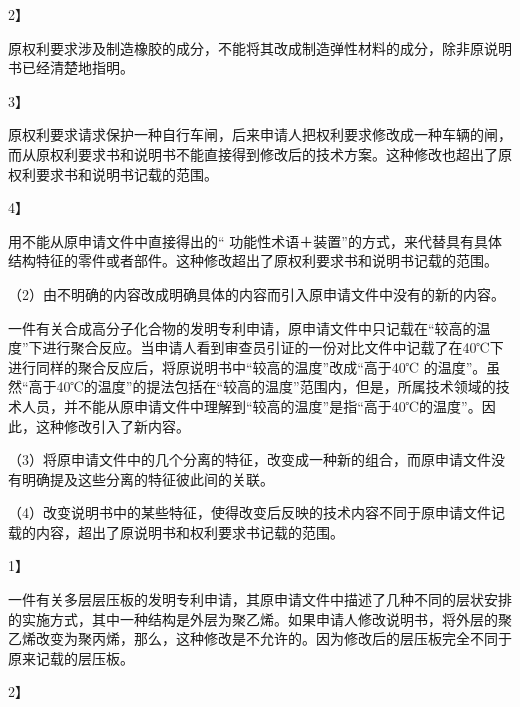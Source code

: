 {2{\kaiti 】}\par}

原权利要求涉及制造橡胶的成分，不能将其改成制造弹性材料的成分，除非原说明书已经清楚地指明。

{3{\kaiti 】}\par}

原权利要求请求保护一种自行车闸，后来申请人把权利要求修改成一种车辆的闸，而从原权利要求书和说明书不能直接得到修改后的技术方案。这种修改也超出了原权利要求书和说明书记载的范围。

{4{\kaiti 】}\par}

用不能从原申请文件中直接得出的“ 功能性术语＋装置”的方式，来代替具有具体结构特征的零件或者部件。这种修改超出了原权利要求书和说明书记载的范围。

{\setlength{\parindent}{17.1bp}（2）由不明确的内容改成明确具体的内容而引入原申请文件中没有的新的内容。\par}

{\par}

一件有关合成高分子化合物的发明专利申请，原申请文件中只记载在“较高的温度”下进行聚合反应。当申请人看到审查员引证的一份对比文件中记载了在40℃下进行同样的聚合反应后，将原说明书中“较高的温度”改成“高于40℃ 的温度”。虽然“高于40℃的温度”的提法包括在“较高的温度”范围内，但是，所属技术领域的技术人员，并不能从原申请文件中理解到“较高的温度”是指“高于40℃的温度”。因此，这种修改引入了新内容。

{\setlength{\parindent}{17.1bp}（3）将原申请文件中的几个分离的特征，改变成一种新的组合，而原申请文件没有明确提及这些分离的特征彼此间的关联。\par}

{\setlength{\parindent}{17.1bp}（4）改变说明书中的某些特征，使得改变后反映的技术内容不同于原申请文件记载的内容，超出了原说明书和权利要求书记载的范围。\par}

{1{\kaiti 】}\par}

一件有关多层层压板的发明专利申请，其原申请文件中描述了几种不同的层状安排的实施方式，其中一种结构是外层为聚乙烯。如果申请人修改说明书，将外层的聚乙烯改变为聚丙烯，那么，这种修改是不允许的。因为修改后的层压板完全不同于原来记载的层压板。

{2{\kaiti 】}\par}

